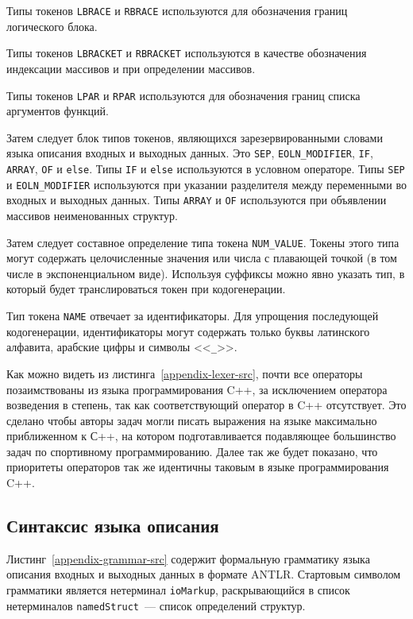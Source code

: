 \documentclass[times,specification,annotation]{style/itmo-student-thesis/itmo-student-thesis}
\begin{document}
Типы токенов \texttt{LBRACE} и \texttt{RBRACE} используются для обозначения границ логического блока.

Типы токенов \texttt{LBRACKET} и \texttt{RBRACKET} используются в качестве обозначения индексации массивов и при определении массивов.

Типы токенов \texttt{LPAR} и \texttt{RPAR} используются для обозначения границ списка аргументов функций.

Затем следует блок типов токенов, являющихся зарезервированными словами языка описания входных и выходных данных. Это \texttt{SEP}, \texttt{EOLN\_MODIFIER}, \texttt{IF}, \texttt{ARRAY}, \texttt{OF} и \texttt{else}. Типы \texttt{IF} и \texttt{else} используются в условном операторе. Типы \texttt{SEP} и \texttt{EOLN\_MODIFIER} используются при указании разделителя между переменными во входных и выходных данных. Типы \texttt{ARRAY} и \texttt{OF} используются при объявлении массивов неименованных структур.

Затем следует составное определение типа токена \texttt{NUM\_VALUE}. Токены этого типа могут содержать целочисленные значения или числа с плавающей точкой (в том числе в экспоненциальном виде). Используя суффиксы можно явно указать тип, в который будет транслироваться токен при кодогенерации.

Тип токена \texttt{NAME} отвечает за идентификаторы. Для упрощения последующей кодогенерации, идентификаторы могут содержать только буквы латинского алфавита, арабские цифры и символы <<\texttt{\_}>>.

Как можно видеть из листинга~\ref{appendix-lexer-src}, почти все операторы позаимствованы из языка программирования C++, за исключением оператора возведения в степень, так как соответствующий оператор в C++ отсутствует. Это сделано чтобы авторы задач могли писать выражения на языке максимально приближенном к С++, на котором подготавливается подавляющее большинство задач по спортивному программированию. Далее так же будет показано, что приоритеты операторов так же идентичны таковым в языке программирования C++.

\subsection{Синтаксис языка описания}

Листинг~\ref{appendix-grammar-src} содержит формальную грамматику языка описания входных и выходных данных в формате ANTLR. Стартовым символом грамматики является нетерминал \texttt{ioMarkup}, раскрывающийся в список нетерминалов \texttt{namedStruct}~--- список определений структур.
\end{document}

